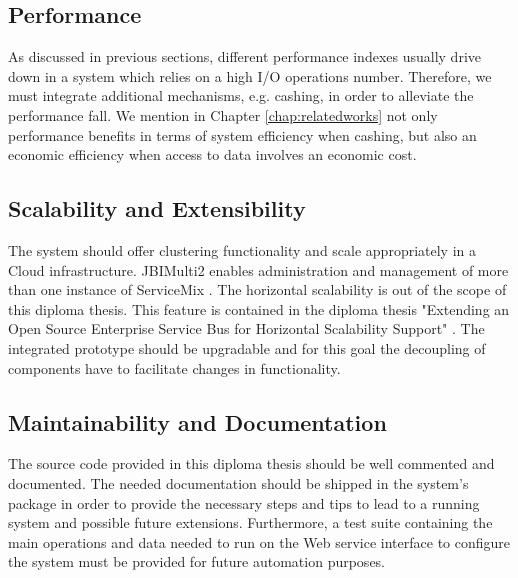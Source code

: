 \subsection{Performance}
As discussed in previous sections, different performance indexes usually drive down in a system which relies on a high I/O operations number. Therefore, we must integrate additional mechanisms, e.g. cashing, in order to alleviate the performance fall. We mention in Chapter \ref{chap:relatedworks} not only performance benefits in terms of system efficiency when cashing, but also an economic efficiency when access to data involves an economic cost.

\subsection{Scalability and Extensibility}
The system should offer clustering functionality and scale appropriately in a Cloud infrastructure. JBIMulti2 enables administration and management of more than one instance of ServiceMix \cite{Muhler2012}. The horizontal scalability is out of the scope of this diploma thesis. This feature is contained in the diploma thesis "Extending an Open Source Enterprise Service Bus for Horizontal Scalability Support" \cite{Fest2012}. The integrated prototype should be upgradable and for this goal the decoupling of components have to facilitate changes in functionality. 

\subsection{Maintainability and Documentation}
The source code provided in this diploma thesis should be well commented and documented. The needed documentation should be shipped in the system's package in order to provide the necessary steps and tips to lead to a running system and possible future extensions. Furthermore, a test suite containing the main operations and data needed to run on the Web service interface to configure the system must be provided for future automation purposes. 






